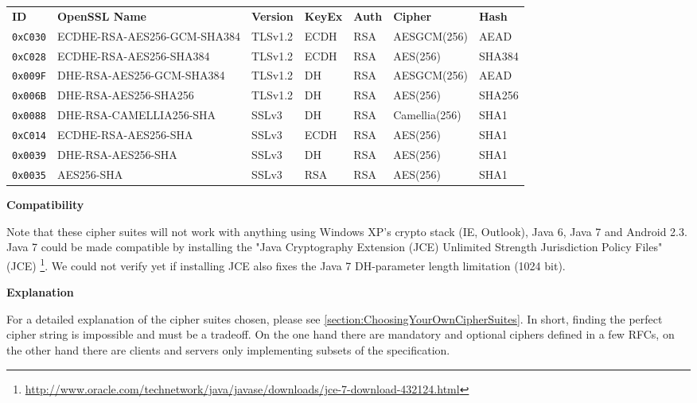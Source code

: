 \begin{center}
\begin{tabular}{lllllll}
\toprule
\textbf{ID}   & \textbf{OpenSSL Name}       & \textbf{Version} & \textbf{KeyEx} & \textbf{Auth} & \textbf{Cipher} & \textbf{Hash}\\\cmidrule(lr){1-7}
\verb|0xC030| & ECDHE-RSA-AES256-GCM-SHA384 & TLSv1.2          & ECDH           &  RSA          & AESGCM(256)     & AEAD         \\ 
\verb|0xC028| & ECDHE-RSA-AES256-SHA384     & TLSv1.2          & ECDH           &  RSA          & AES(256)        & SHA384       \\ 
\verb|0x009F| & DHE-RSA-AES256-GCM-SHA384   & TLSv1.2          & DH             &  RSA          & AESGCM(256)     & AEAD         \\ 
\verb|0x006B| & DHE-RSA-AES256-SHA256       & TLSv1.2          & DH             &  RSA          & AES(256)        & SHA256       \\ 
\verb|0x0088| & DHE-RSA-CAMELLIA256-SHA     & SSLv3            & DH             &  RSA          & Camellia(256)   & SHA1         \\ 
\verb|0xC014| & ECDHE-RSA-AES256-SHA        & SSLv3            & ECDH           &  RSA          & AES(256)        & SHA1         \\ 
\verb|0x0039| & DHE-RSA-AES256-SHA          & SSLv3            & DH             &  RSA          & AES(256)        & SHA1         \\ 
\verb|0x0035| & AES256-SHA                  & SSLv3            & RSA            &  RSA          & AES(256)        & SHA1         \\
\bottomrule
\end{tabular}
\end{center}

\textbf{Compatibility}

Note that these cipher suites will not work with anything using Windows XP's
crypto stack (IE, Outlook), Java 6, Java 7 and Android 2.3. Java 7 could be
made compatible by installing the "Java Cryptography Extension (JCE) Unlimited
Strength Jurisdiction Policy Files"
(JCE) \footnote{\url{http://www.oracle.com/technetwork/java/javase/downloads/jce-7-download-432124.html}}.
We could not verify yet if installing JCE also fixes the Java 7
DH-parameter length limitation (1024 bit). 

\textbf{Explanation}

For a detailed explanation of the cipher suites chosen, please see
\ref{section:ChoosingYourOwnCipherSuites}. In short, finding the perfect cipher
string is impossible and must be a tradeoff. On the one hand
there are mandatory and optional ciphers defined in a few RFCs, on the other hand
there are clients and servers only implementing subsets of the specification.

